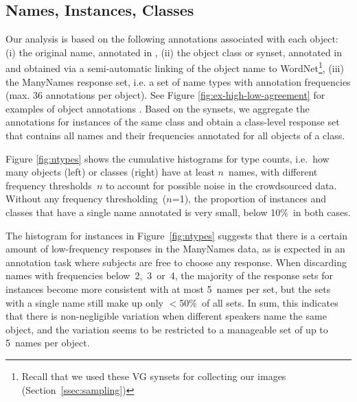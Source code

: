 \subsection{Names, Instances, Classes}
\label{subsec:counts}

Our analysis is based on the following annotations associated with each object: (i) the original name, annotated in \vg, (ii) the object class or synset, annotated in \vg and obtained via a semi-automatic linking of the object name to WordNet\footnote{Recall that we used these VG synsets for collecting our images (Section~\ref{ssec:sampling})}, (iii) the ManyNames response set, i.e. a set of name types with annotation frequencies (max. 36 annotations per object). See Figure \ref{fig:ex-high-low-agreement} for examples of object annotations . Based on the \vg synsets, we aggregate the annotations for instances of the same class and obtain a class-level response set that contains all names and their frequencies annotated for all objects of a class. 
 
Figure \ref{fig:ntypes} shows the cumulative histograms for type counts, i.e.\ how many objects (left) or classes (right) have at least $n$\ names, with different frequency thresholds~$n$ to account for possible noise in the crowdsourced data.
Without any frequency thresholding~\mbox{($n$=1)}, the proportion of instances and classes that have a single name annotated is very small, below 10\%\ in both cases. 

The histogram for instances in Figure\ \ref{fig:ntypes} suggests that there is a certain amount of low-frequency responses in the ManyNames data, as is expected in an annotation task where subjects are free to choose any response. 
When discarding names with frequencies below\ \mbox{2, 3 or 4}, the %
majority of the response sets for instances become more consistent with at most 5\ names per set, 
but the sets with a single name still make up only $<$50\%\ of all sets. 
In sum, this indicates that there is non-negligible variation when different speakers name the same object, and the variation seems to be restricted to a manageable set of up to 5\ names per object.

